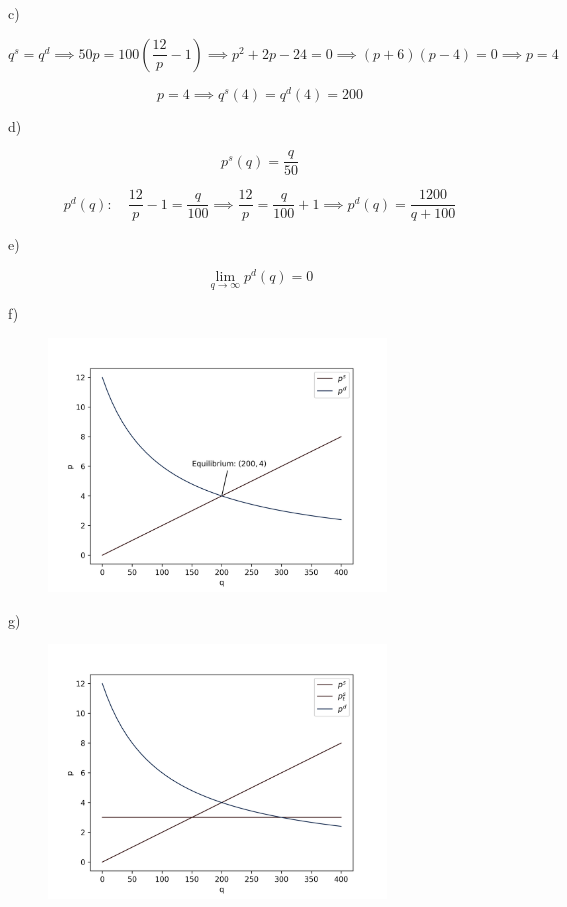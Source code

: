 \documentclass{article}
\begin{document}
c)

$$
  q^s = q^d \implies 50p = 100\left( \frac{12}{p}-1 \right) \implies p^2+2p-24 = 0 \implies (p+6)(p-4) = 0 \implies p = 4
$$

$$
  p=4 \implies q^s(4) = q^d(4) = 200
$$

d)

$$
  p^s(q) = \frac{q}{50}
$$

$$
  p^d(q): \quad \frac{12}{p} - 1 = \frac{q}{100} \implies \frac{12}{p} = \frac{q}{100} + 1 \implies p^d(q) = \frac{1200}{q+100}
$$

e)

$$
  \lim_{q\to\infty} p^d(q) = 0
$$

f)

\begin{figure}[H]
  \centering
  \includegraphics[width=0.8\textwidth]{figures/4_Functions/LQ1f.png}
\end{figure}

g)

\begin{figure}[H]
  \centering
  \includegraphics[width=0.8\textwidth]{figures/4_Functions/LQ1g.png}
\end{figure}
\end{document}
